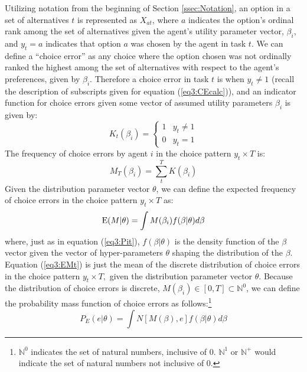 \documentclass[../main.tex]{subfiles}
\begin{document}
Utilizing notation from the beginning of Section \ref{ssec:Notation}, an option in a set of alternatives $t$ is represented as $X_{at}$, where $a$ indicates the option's ordinal rank among the set of alternatives given the agent's utility parameter vector, $\beta_i$, and $y_t = a$ indicates that option $a$ was chosen by the agent in task $t$.
We can define a \enquote{choice error} as any choice where the option chosen was not ordinally ranked the highest among the set of alternatives with respect to the agent's preferences, given by $\beta_i$.
Therefore a choice error in task $t$ is when $y_t \neq 1$ (recall the description of subscripts given for equation (\ref{eq3:CEcalc})), and an indicator function for choice errors given some vector of assumed utility parameters $\beta_i$ is given by:
\begin{equation}
	\label{eq3:Itb}
	K_{t}(\beta_i) =
	\begin{cases}
		 1 & y_t \neq 1\\
		 0 & y_t = 1
	\end{cases}
\end{equation}
\noindent The frequency of choice errors by agent $i$ in the choice pattern $y_t \times T$ is:
\begin{equation}
	\label{eq3:MTBn}
	M_T(\beta_i) = \sum_t^T K(\beta_i)
\end{equation}
\noindent Given the distribution parameter vector $\theta$, we can define the expected frequency of choice errors in the choice pattern $y_t \times T$ as:
\begin{equation}
	\label{eq3:EMt}
	\operatorname{E}(M | \theta) = \int M(\beta_i) f(\beta | \theta) d\beta
\end{equation}
\noindent where, just as in equation (\ref{eq3:Pit}), $f(\beta|\theta)$ is the density function of the $\beta$ vector given the vector of hyper-parameters $\theta$ shaping the distribution of the $\beta$.
Equation (\ref{eq3:EMt}) is just the mean of the discrete distribution of choice errors in the choice pattern $y_t \times T,$ given the distribution parameter vector $\theta$.
Because the distribution of choice errors is discrete, $M(\beta_i) \in [0,T] \subset \mathbb{N}^0$, we can define the probability mass function of choice errors as follows:\footnote{
	$\mathbb{N}^0$ indicates the set of natural numbers, inclusive of $0$. $\mathbb{N}^1$ or $\mathbb{N}^{+}$ would indicate the set of natural numbers not inclusive of 0.
}
\begin{equation}
	\label{eq3:PE}
	P_E(e | \theta) = \int N[M(\beta),e] f(\beta|\theta) d \beta
\end{equation}
\end{document}
